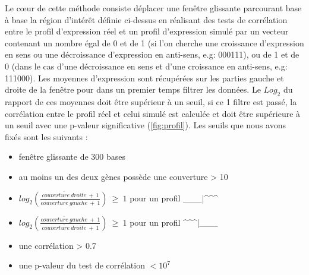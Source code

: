 \documentclass[12pt,a4paper]{report}
\begin{document}
\begin{onehalfspace}
Le cœur de cette méthode consiste déplacer une fenêtre glissante parcourant base à base la région d'intérêt définie ci-dessus en réalisant des tests de corrélation entre le profil d'expression réel et un profil d'expression simulé par un vecteur contenant un nombre égal de 0 et de 1 (si l'on cherche une croissance d'expression en sens ou une décroissance d'expression en anti-sens, e.g: 000111), ou de 1 et de 0 (dans le cas d'une décroissance en sens et d'une croissance en anti-sens, e.g: 111000). Les moyennes d'expression sont récupérées sur les parties gauche et droite de la fenêtre pour dans un premier temps filtrer les données. Le $Log_2$ du rapport de ces moyennes doit être supérieur à un seuil, si ce 1 filtre est passé, la corrélation entre le profil réel et celui simulé est calculée et doit être supérieure à un seuil avec une p-valeur significative (\autoref{fig:profil}). Les seuils que nous avons fixés sont les suivants : 
\begin{itemize}[label=$\bullet$]
\item fenêtre glissante de 300 bases
\item au moins un des deux gènes possède une couverture > 10
\item $log_2(\frac{\overline{couverture~droite}~+~1}{\overline{couverture~gauche}~+~1})~\geq~1$ pour un profil \_\_\_|\^{ }\^{ }\^{ }
\item $log_2(\frac{\overline{couverture~gauche}~+~1}{\overline{couverture~droite}~+~1})~\geq~1$ pour un profil \^{ }\^{ }\^{ }|\_\_\_
\item une corrélation > 0.7
\item une p-valeur du test de corrélation $< 10^7$
\end{itemize}
\begin{figure}
\end{figure}
\end{onehalfspace}
\end{document}
